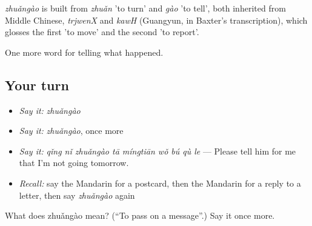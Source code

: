 \begin{cousinweb}
\emph{zhuǎngào} is built from \emph{zhuǎn} 'to turn' and \emph{gào} 'to tell', both inherited from Middle Chinese, \emph{trjwenX} and \emph{kawH} (Guangyun, in Baxter's transcription), which glosses the first 'to move' and the second 'to report'.
\end{cousinweb}

\begin{grammarlens}[title={What you've built}]
One more word for telling what happened.
\end{grammarlens}

\subsection*{Your turn}
\begin{itemize}
\raggedright
  \item \emph{Say it:} \emph{zhuǎngào}
  \item \emph{Say it:} \emph{zhuǎngào}, once more
  \item \emph{Say it:} \emph{qǐng nǐ zhuǎngào tā míngtiān wǒ bú qù le} — Please tell him for me that I'm not going tomorrow.
  \item \emph{Recall:} say the Mandarin for a postcard, then the Mandarin for a reply to a letter, then say \emph{zhuǎngào} again
\end{itemize}

\begin{tcolorbox}[breakable,colback=teal!4,colframe=teal!35!black,title={Before you move on}]
What does zhuǎngào mean? (\textquotedblleft{}To pass on a message\textquotedblright{}.) Say it once more.
\end{tcolorbox}
